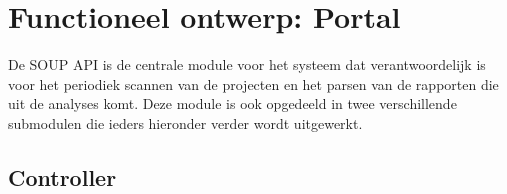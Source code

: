 \chapter{Functioneel ontwerp: Portal}\label{ch:impl-Portal}
De SOUP API is de centrale module voor het systeem dat verantwoordelijk is voor het periodiek scannen van de projecten en het parsen van de rapporten die uit de analyses komt. Deze module is ook opgedeeld in twee verschillende submodulen die ieders hieronder verder wordt uitgewerkt.

\section{Controller}\label{sec:controller}

